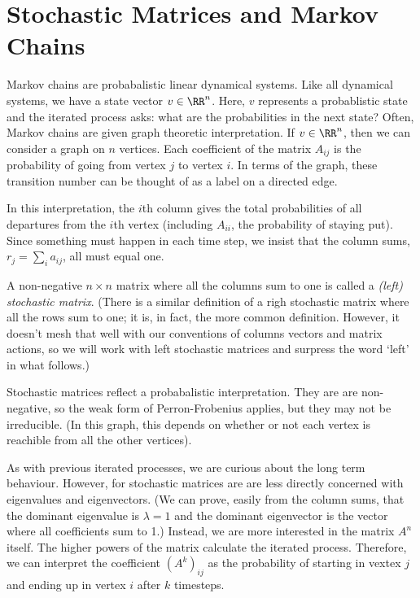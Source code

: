 \documentclass[fleqn]{report}
\begin{document}
\section{Stochastic Matrices and Markov Chains}
\label{stochastic}

Markov chains are probabalistic linear dynamical systems.
Like all dynamical systems, we have a state vector $v \in
\RR^n$. Here, $v$ represents a probablistic state and the
iterated process asks: what are the probabilities in the next
state? Often, Markov chains are given graph theoretic
interpretation. If $v \in \RR^n$, then we can consider a graph
on $n$ vertices. Each coefficient of the matrix $A_{ij}$ is
the probability of going from vertex $j$ to vertex $i$. In
terms of the graph, these transition number can be thought of
as a label on a directed edge.

In this interpretation, the $i$th column gives the total
probabilities of all departures from the $i$th vertex
(including $A_{ii}$, the probability of staying put). Since
something must happen in each time step, we insist that the
column sums, $r_j = \sum_i a_{ij}$, all must equal one. 

\begin{defn}
A non-negative $n \times n$ matrix where all the columns sum
to one is called a \emph{(left) stochastic matrix}. (There is
a similar definition of a righ stochastic matrix where all the
rows sum to one; it is, in fact, the more common definition.
However, it doesn't mesh that well with our conventions of
columns vectors and matrix actions, so we will work with left
stochastic matrices and surpress the word `left' in what
follows.)
\end{defn}

Stochastic matrices reflect a probabalistic interpretation.
They are are non-negative, so the weak form of Perron-Frobenius
applies, but they may not be irreducible. (In this graph,
this depends on whether or not each vertex is reachible from
all the other vertices).

As with previous iterated processes, we are curious about the
long term behaviour. However, for stochastic matrices are are
less directly concerned with eigenvalues and eigenvectors.
(We can prove, easily from the column sums, that the dominant
eigenvalue is $\lambda = 1$ and the dominant eigenvector is
the vector where all coefficients sum to 1.) Instead, we are more
interested in the matrix $A^n$ itself. The higher powers of
the matrix calculate the iterated process. Therefore, we can
interpret the coefficient $(A^k)_{ij}$ as the probability of
starting in vextex $j$ and ending up in vertex $i$ after $k$
timesteps.
\end{document}
